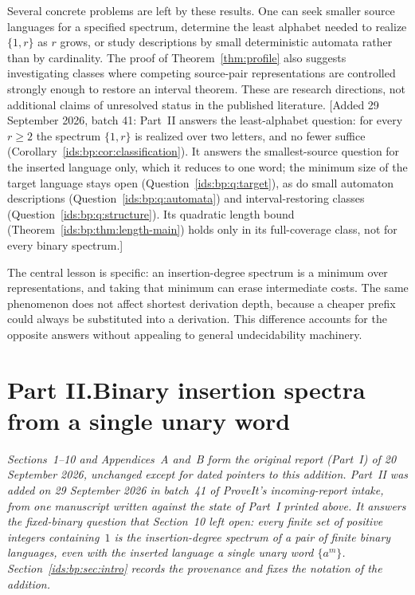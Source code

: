 \documentclass[11pt,letterpaper]{article}
\theoremstyle{definition}\newtheorem{definition}[theorem]{Definition}
\theoremstyle{remark}\newtheorem{remark}[theorem]{Remark}
\theoremstyle{definition}\newtheorem{question}[theorem]{Question}
\begin{document}
Several concrete problems are left by these results. One can seek smaller source languages for a specified spectrum, determine the least alphabet needed to realize $\{1,r\}$ as $r$ grows, or study descriptions by small deterministic automata rather than by cardinality. The proof of Theorem~\ref{thm:profile} also suggests investigating classes where competing source-pair representations are controlled strongly enough to restore an interval theorem. These are research directions, not additional claims of unresolved status in the published literature.
[Added 29 September 2026, batch 41: Part~II answers the least-alphabet question: for every $r\geq2$ the spectrum $\{1,r\}$ is realized over two letters, and no fewer suffice (Corollary~\ref{ids:bp:cor:classification}). It answers the smallest-source question for the inserted language only, which it reduces to one word; the minimum size of the target language stays open (Question~\ref{ids:bp:q:target}), as do small automaton descriptions (Question~\ref{ids:bp:q:automata}) and interval-restoring classes (Question~\ref{ids:bp:q:structure}). Its quadratic length bound (Theorem~\ref{ids:bp:thm:length-main}) holds only in its full-coverage class, not for every binary spectrum.]

The central lesson is specific: an insertion-degree spectrum is a minimum over representations, and taking that minimum can erase intermediate costs. The same phenomenon does not affect shortest derivation depth, because a cheaper prefix could always be substituted into a derivation. This difference accounts for the opposite answers without appealing to general undecidability machinery.

\clearpage
{}\part*{Part II.\quad Binary insertion spectra from a single unary word}

\noindent\emph{Sections~1--10 and Appendices~A and~B form the
original report (Part~I) of 20 September 2026, unchanged except for dated
pointers to this addition. Part~II was added on 29 September 2026 in
batch~41 of ProveIt's incoming-report intake, from one manuscript written
against the state of Part~I printed above. It answers the fixed-binary
question that Section~10 left open: every finite set of positive integers
containing~$1$ is the insertion-degree spectrum of a pair of finite binary
languages, even with the inserted language a single unary word $\{a^m\}$.
Section~\ref{ids:bp:sec:intro} records the provenance and fixes the notation
of the addition.}
\end{document}
